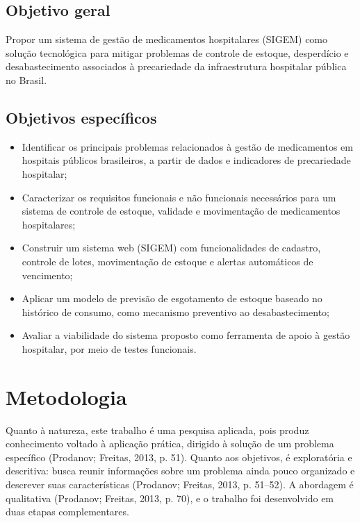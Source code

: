 \documentclass[12pt,a4paper]{article}
\begin{document}
\subsection{Objetivo geral}

Propor um sistema de gestão de medicamentos hospitalares (SIGEM) como solução tecnológica para mitigar problemas de controle de estoque, desperdício e desabastecimento associados à precariedade da infraestrutura hospitalar pública no Brasil.

\subsection{Objetivos específicos}

\begin{itemize}
  \item Identificar os principais problemas relacionados à gestão de medicamentos em hospitais públicos brasileiros, a partir de dados e indicadores de precariedade hospitalar;
  \item Caracterizar os requisitos funcionais e não funcionais necessários para um sistema de controle de estoque, validade e movimentação de medicamentos hospitalares;
  \item Construir um sistema web (SIGEM) com funcionalidades de cadastro, controle de lotes, movimentação de estoque e alertas automáticos de vencimento;
  \item Aplicar um modelo de previsão de esgotamento de estoque baseado no histórico de consumo, como mecanismo preventivo ao desabastecimento;
  \item Avaliar a viabilidade do sistema proposto como ferramenta de apoio à gestão hospitalar, por meio de testes funcionais.
\end{itemize}

\section{Metodologia}

Quanto à natureza, este trabalho é uma pesquisa aplicada, pois produz conhecimento voltado à aplicação prática, dirigido à solução de um problema específico (Prodanov; Freitas, 2013, p. 51). Quanto aos objetivos, é exploratória e descritiva: busca reunir informações sobre um problema ainda pouco organizado e descrever suas características (Prodanov; Freitas, 2013, p. 51--52). A abordagem é qualitativa (Prodanov; Freitas, 2013, p. 70), e o trabalho foi desenvolvido em duas etapas complementares.
\end{document}
